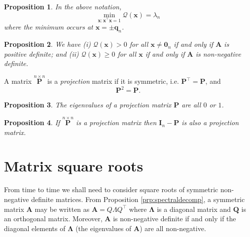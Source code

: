 \documentclass[]{book}
\newtheorem{proposition}{Proposition}[chapter]
\theoremstyle{definition}
\theoremstyle{definition}
\theoremstyle{definition}
\theoremstyle{remark}
\begin{document}
\begin{proposition}
\protect\hypertarget{prp:unnamed-chunk-6}{}{\label{prp:unnamed-chunk-6} }In the above notation,
\[\min_{\boldsymbol x: \boldsymbol x^\top \boldsymbol x=1} \mathcal{Q}({\mathbf x})=\lambda_n\]
where the minimum occurs at \(\boldsymbol x= \pm \boldsymbol q_n\).
\end{proposition}

\begin{proposition}
\protect\hypertarget{prp:unnamed-chunk-7}{}{\label{prp:unnamed-chunk-7} }We have (i) \(\mathcal{Q}(\boldsymbol x)>0\) for all
\(\boldsymbol x\neq {\mathbf 0}_n\) if and only if \(\mathbf A\) is positive definite; and
(ii) \(\mathcal{Q}(\boldsymbol x)\geq 0\) for all \(\boldsymbol x\) if and only if \(\boldsymbol A\) is non-negative definite.
\end{proposition}

A matrix \(\stackrel{n \times n}{\boldsymbol P}\) is a \emph{projection}
matrix if it is symmetric, i.e. \(\boldsymbol P^\top =\boldsymbol P\), and
\[
\boldsymbol P^2 =\boldsymbol P.
\]

\begin{proposition}
\protect\hypertarget{prp:unnamed-chunk-8}{}{\label{prp:unnamed-chunk-8} }The eigenvalues of a projection matrix \(\boldsymbol P\) are all \(0\) or \(1\).
\end{proposition}

\begin{proposition}
\protect\hypertarget{prp:unnamed-chunk-9}{}{\label{prp:unnamed-chunk-9} }If \(\stackrel{n \times n}{\boldsymbol P}\) is a projection matrix then \({\mathbf I}_n - \boldsymbol P\) is also
a projection matrix.
\end{proposition}

\hypertarget{matrix-square-roots}{%
\section{Matrix square roots}\label{matrix-square-roots}}

From time to time we shall need to consider square roots of symmetric non-negative definite matrices. From Proposition \ref{prp:spectraldecomp}, a symmetric
matrix \(\mathbf A\) may be written as
\(\mathbf A=Q \Lambda Q^\top\) where \(\mathbf \Lambda\) is a diagonal matrix and \(\mathbf Q\) is an orthogonal matrix. Moreover, \(\boldsymbol A\) is non-negative definite if and only if the diagonal elements of \(\mathbf \Lambda\) (the
eigenvalues of \(\mathbf A\)) are all non-negative.
\end{document}
